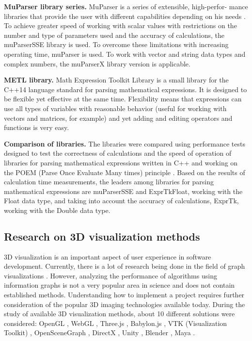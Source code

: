 \textbf{MuParser library series.} MuParser is a series of extensible, high-perfor- mance libraries that provide the user with different capabilities depending on his needs \cite{m19}. To achieve greater speed of working with scalar values with restrictions on the number and type of parameters used and the accuracy of calculations, the muParserSSE library is used. To overcome these limitations with increasing operating time, muParser is used. To work with vector and string data types and complex numbers, the muParserX library version is applicable.

\textbf{METL library.} Math Expression Toolkit Library is a small library for the C++14 language standard for parsing mathematical expressions. It is designed to be flexible yet effective at the same time. Flexibility means that expressions can use all types of variables with reasonable behavior (useful for working with vectors and matrices, for example) and yet adding and editing operators and functions is very easy.

\textbf{Comparison of libraries.} The libraries were compared using performance tests designed to test the correctness of calculations and the speed of operation of libraries for parsing mathematical expressions written in C++ and working on the POEM (Parse Once Evaluate Many times) principle \cite{m22}. Based on the results of calculation time measurements, the leaders among libraries for parsing mathematical expressions are muParserSSE and ExprTkFloat, working with the Float data type, and taking into account the accuracy of calculations, ExprTk, working with the Double data type.

\subsection{Research on 3D visualization methods} 3D visualization is an important aspect of user experience in software development. Currently, there is a lot of research being done in the field of graph visualizations \cite{m23,m24,m25,m26,m27}. However, analyzing the performance of algorithms using information graphs is not a very popular area in science and does not contain established methods. Understanding how to implement a project requires further consideration of the popular 3D imaging technologies available today. During the study of available 3D visualization methods, about 10 different solutions were considered: OpenGL \cite{m28}, WebGL \cite{m29,m30,m31}, Three.js \cite{m32,m33}, Babylon.js \cite{m34}, VTK (Visualization Toolkit) \cite{m35}, OpenSceneGraph \cite{m36}, DirectX \cite{m37}, Unity \cite{m38}, Blender \cite{m39}, Maya \cite{m40}.

